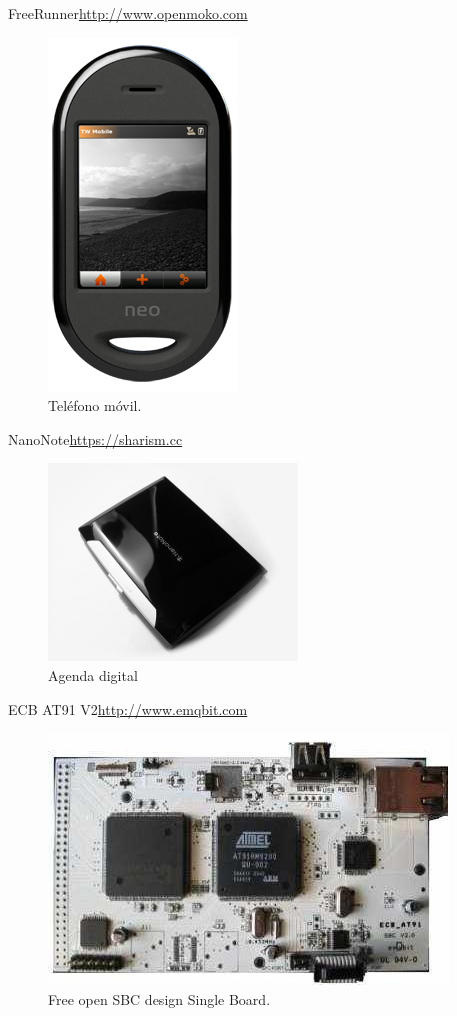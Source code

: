 \documentclass{beamer}
\begin{document}
\begin{frame}{FreeRunner}{\url{http://www.openmoko.com}}
  \begin{figure}
    \includegraphics[scale=0.65]{img/freerunner_shop1}
    \caption{Teléfono móvil.}
    \label{fig:openmoko}
  \end{figure}
\end{frame}

\begin{frame}{NanoNote}{\url{https://sharism.cc}}
  \begin{figure}
    \centering
    \includegraphics{img/nano}
    \caption{Agenda digital}
    \label{fig:nanonote}
  \end{figure}
\end{frame}

\begin{frame}{ECB AT91 V2}{\url{http://www.emqbit.com}}
  \begin{figure}
    \includegraphics[scale=0.6]{img/V2}
    \caption{Free open SBC design Single Board.}
    \label{fig:ecb}
  \end{figure}
\end{frame}
\end{document}
